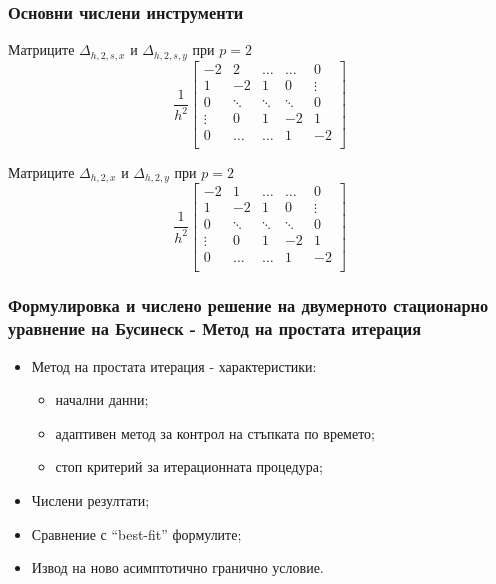 \documentclass{beamer}
\begin{document}
\begin{frame}
\frametitle{Основни числени инструменти}

Матриците $\Delta_{h,2,s,x}$ и $\Delta_{h,2,s,y}$ при $p=2$
\[
\frac{1}{h^2}
\begin{bmatrix}
    -2	       & 2        &     \dots   &   \dots        & 0   \\
    1               & -2            &   1           &   0               & \vdots    \\
        0           & \ddots        &    \ddots    &   \ddots       &  0 \\ 
    \vdots       &     0            &  1     	& -2    	   & 1 \\
    0               & \dots          &  \dots         & 1  	   & -2 \\
\end{bmatrix}
\]

Матриците $\Delta_{h,2,x}$ и $\Delta_{h,2,y}$ при $p=2$
\[
\frac{1}{h^2}
\begin{bmatrix}
    -2	       & 1        &     \dots   &   \dots        & 0   \\
    1               & -2            &   1           &   0               & \vdots    \\
        0           & \ddots        &    \ddots    &   \ddots       &  0 \\ 
    \vdots       &     0            &  1     	& -2    	   & 1 \\
    0               & \dots          &  \dots         & 1  	   & -2 \\
\end{bmatrix}
\]
\end{frame}


\begin{frame}
\frametitle{Формулировка и числено решение на двумерното стационарно уравнение на Бусинеск - Метод на простата итерация}
\begin{itemize}
  \item Метод на простата итерация - характеристики:
	\begin{itemize}
	  \item начални данни;
	  \item адаптивен метод за контрол на стъпката по времето;
	  \item стоп критерий за итерационната процедура;
	\end{itemize}
  \item Числени резултати;
  \item Сравнение с ``best-fit'' формулите;
  \item Извод на ново асимптотично гранично условие.
\end{itemize}
\end{frame}
\end{document}
